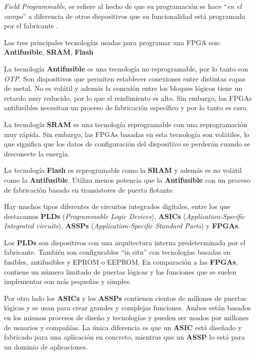\textit{Field Programmable}, se refiere al hecho de que su programación se hace ``\textit{en el campo}'' a diferencia de otros dispositivos 
que su funcionalidad está programada por el fabricante \cite{maxfield1}.

Las tres principales tecnologías usadas para programar una FPGA son: \textbf{Antifusible}, \textbf{SRAM}, \textbf{Flash}

La tecnología \textbf{Antifusible} es una tecnología no reprogramable, por lo tanto son \textit{OTP}. Son dispositivos que permiten establecer 
conexiones entre distintas capas de metal. No es volátil y además la conexión entre los bloques lógicos tiene un retardo muy reducido, por lo 
que el rendimiento es alto. Sin embargo, las FPGAs antifusibles necesitan un proceso de fabricación específico y por lo tanto es caro. 

La tecnología \textbf{SRAM} es una tecnología reprogramable con una reprogramación muy rápida. Sin embargo, las FPGAs basadas en esta tecnología 
son volátiles, lo que significa que los datos de configuración del dispositivo se perderán cuando se desconecte la energía. 

La tecnología \textbf{Flash} es reprogramable como la \textbf{SRAM} y además es no volátil como la \textbf{Antifusible}. Utiliza menos potencia 
que la \textbf{Antifusible} con un proceso de fabricación basado en transistores de puerta flotante.

Hay muchos tipos diferentes de circuitos integrados digitales, entre los que destacamos \textbf{PLDs} (\textit{Programmable Logic Devices}), 
\textbf{ASICs} (\textit{Application-Specific Integrated circuits}), \textbf{ASSPs} (\textit{Application-Specific Standard Parts}) y \textbf{FPGAs}.

Los \textbf{PLDs} son dispositivos con una arquitectura interna predeterminada por el fabricante. También son configurables ``in situ'' con tecnologías basadas en fusibles, 
antifusibles y EPROM o EEPROM. En comparación a las \textbf{FPGAs}, contiene un número limitado de puertas lógicas y las funciones que se suelen implementar 
son más pequeñas y simples.

Por otro lado los \textbf{ASICs} y los \textbf{ASSPs} contienen cientos de millones de puertas lógicas y se usan para crear grandes y complejas 
funciones. Ambos están basados en los mismos procesos de diseño y tecnologías y pueden ser usados por millones de usuarios y compañías. La 
única diferencia es que un \textbf{ASIC} está diseñado y fabricado para una aplicación en concreto, mientras que un \textbf{ASSP} lo está 
para un dominio de aplicaciones.

